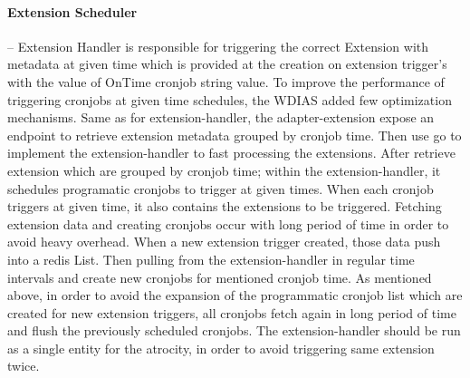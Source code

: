 \paragraph{Extension Scheduler}-- Extension Handler is responsible for triggering the correct Extension with metadata at given time which is provided at the creation on extension trigger's with the value of OnTime cronjob string value. To improve the performance of triggering cronjobs at given time schedules, the WDIAS added few optimization mechanisms.
Same as for extension-handler, the adapter-extension expose an endpoint to retrieve extension metadata grouped by cronjob time. Then use \acrshort{go} to implement the extension-handler to fast processing the extensions. After retrieve extension which are grouped by cronjob time; within the extension-handler, it schedules programatic cronjobs to trigger at given times. When each cronjob triggers at given time, it also contains the extensions to be triggered. Fetching extension data and creating cronjobs occur with long period of time in order to avoid heavy overhead.
When a new extension trigger created, those data push into a \acrshort{redis} List. Then pulling from the extension-handler in regular time intervals and create new cronjobs for mentioned cronjob time.
As mentioned above, in order to avoid the expansion of the programmatic cronjob list which are created for new extension triggers, all cronjobs fetch again in long period of time and flush the previously scheduled cronjobs.
The extension-handler should be run as a single entity for the atrocity, in order to avoid triggering same extension twice.